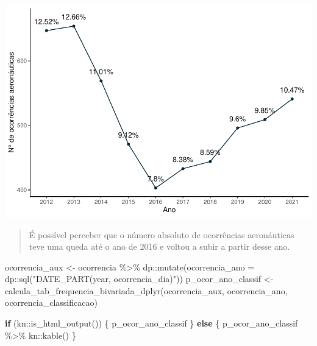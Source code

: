 \documentclass[
]{article}
\newenvironment{Shaded}{\begin{snugshade}}{\end{snugshade}}
\newcommand{\AttributeTok}[1]{\textcolor[rgb]{0.77,0.63,0.00}{#1}}
\newcommand{\ControlFlowTok}[1]{\textcolor[rgb]{0.13,0.29,0.53}{\textbf{#1}}}
\newcommand{\FunctionTok}[1]{\textcolor[rgb]{0.00,0.00,0.00}{#1}}
\newcommand{\NormalTok}[1]{#1}
\newcommand{\OtherTok}[1]{\textcolor[rgb]{0.56,0.35,0.01}{#1}}
\newcommand{\SpecialCharTok}[1]{\textcolor[rgb]{0.00,0.00,0.00}{#1}}
\newcommand{\StringTok}[1]{\textcolor[rgb]{0.31,0.60,0.02}{#1}}
\begin{document}
\begin{center}\includegraphics[width=1\linewidth]{../4.Relatorio/pdf/index_files/figure-latex/unnamed-chunk-23-1} \end{center}

\begin{quote}
É possível perceber que o número absoluto de ocorrências aeronáuticas
teve uma queda até o ano de 2016 e voltou a subir a partir desse ano.
\end{quote}

\begin{Shaded}
\begin{Highlighting}[]
\NormalTok{ocorrencia\_aux }\OtherTok{\textless{}{-}}\NormalTok{ ocorrencia }\SpecialCharTok{\%\textgreater{}\%}
\NormalTok{    dp}\SpecialCharTok{::}\FunctionTok{mutate}\NormalTok{(}\StringTok{\textasciigrave{}}\AttributeTok{ocorrencia\_ano}\StringTok{\textasciigrave{}} \OtherTok{=}\NormalTok{ dp}\SpecialCharTok{::}\FunctionTok{sql}\NormalTok{(}\StringTok{"DATE\_PART(\textquotesingle{}year\textquotesingle{}, ocorrencia\_dia)"}\NormalTok{))}
\NormalTok{p\_ocor\_ano\_classif }\OtherTok{\textless{}{-}} \FunctionTok{calcula\_tab\_frequencia\_bivariada\_dplyr}\NormalTok{(ocorrencia\_aux,}
                                                             \StringTok{\textasciigrave{}}\AttributeTok{ocorrencia\_ano}\StringTok{\textasciigrave{}}\NormalTok{,}
                                                             \StringTok{\textasciigrave{}}\AttributeTok{ocorrencia\_classificacao}\StringTok{\textasciigrave{}}\NormalTok{)}

\ControlFlowTok{if}\NormalTok{ (kn}\SpecialCharTok{::}\FunctionTok{is\_html\_output}\NormalTok{()) \{}
\NormalTok{    p\_ocor\_ano\_classif}
\NormalTok{\} }\ControlFlowTok{else}\NormalTok{ \{}
\NormalTok{    p\_ocor\_ano\_classif }\SpecialCharTok{\%\textgreater{}\%}\NormalTok{ kn}\SpecialCharTok{::}\FunctionTok{kable}\NormalTok{()}
\NormalTok{\}}
\end{Highlighting}
\end{Shaded}
\end{document}
